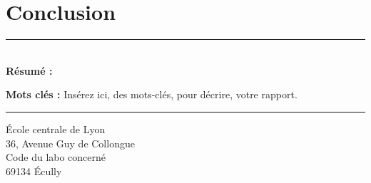 \documentclass[a4paper,12pt,french]{article}
\begin{document}
\pagebreak
\section{Conclusion}
\lipsum[3]


%
%







\pagebreak
\thispagestyle{empty}

\vspace*{\fill}
\noindent\rule[2pt]{\textwidth}{0.5pt}\\
{\textbf{Résumé :}}
\lipsum[1]

{\noindent\textbf{Mots clés :}}
Insérez ici, des mots-clés, pour décrire, votre rapport.
\\
\noindent\rule[2pt]{\textwidth}{0.5pt}
\begin{center}
	École centrale de Lyon\\
	36, Avenue Guy de Collongue\\
	Code du labo concerné\\
	69134 Écully
\end{center}
\vspace*{\fill}
\end{document}
